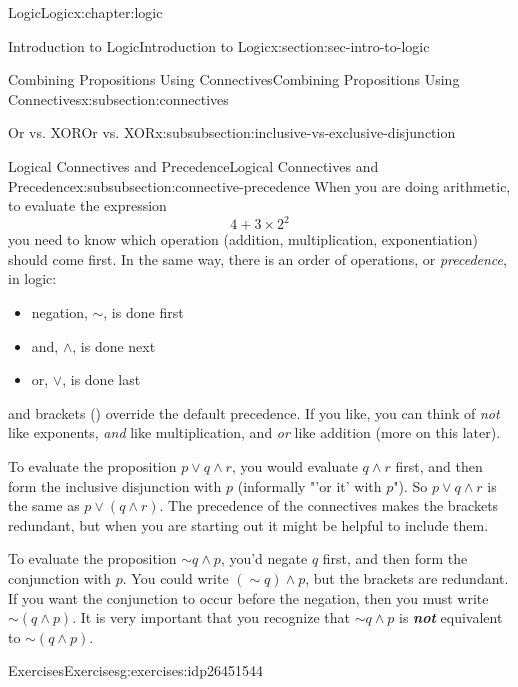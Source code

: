 \documentclass[twoside,10pt,]{book}
\newcommand{\alert}[1]{\textbf{\textit{#1}}}
\numberwithin{equation}{section}
\begin{document}
\begin{chapterptx}{Logic}{}{Logic}{}{}{x:chapter:logic}
\begin{sectionptx}{Introduction to Logic}{}{Introduction to Logic}{}{}{x:section:sec-intro-to-logic}
\begin{subsectionptx}{Combining Propositions Using Connectives}{}{Combining Propositions Using Connectives}{}{}{x:subsection:connectives}
\begin{subsubsectionptx}{Or vs. XOR}{}{Or vs. XOR}{}{}{x:subsubsection:inclusive-vs-exclusive-disjunction}
\end{subsubsectionptx}
%
%
\typeout{************************************************}
\typeout{************************************************}
%
\begin{subsubsectionptx}{Logical Connectives and Precedence}{}{Logical Connectives and Precedence}{}{}{x:subsubsection:connective-precedence}
When you are doing arithmetic, to evaluate the expression%
\begin{equation*}
4+3\times 2^2
\end{equation*}
you need to know which operation (addition, multiplication, exponentiation) should come first.  In the same way, there is an order of operations, or \emph{precedence}, in logic:%
\begin{itemize}[label=\textbullet]
\item{}negation, \(\sim\), is done first%
\item{}and, \({\wedge}\), is done next%
\item{}or, \({\vee}\), is done last%
\end{itemize}
and brackets () override the default precedence.  If you like, you can think of \emph{not} like exponents, \emph{and} like multiplication, and \emph{or} like addition (more on this later).%
\par
To evaluate the proposition \(p{\vee} q{\wedge} r\), you would evaluate \(q{\wedge} r\) first, and then form the inclusive disjunction with \(p\) (informally "'or it' with \(p\)").  So \(p{\vee} q{\wedge} r\) is the same as \(p{\vee}(q{\wedge} r)\).  The precedence of the connectives makes the brackets redundant, but when you are starting out it might be helpful to include them.%
\par
To evaluate the proposition \(\sim\!{q}{\wedge} p\), you'd negate \(q\) first, and then form the conjunction with \(p\).  You could write \((\sim\!{q}){\wedge} p\), but the brackets are redundant.  If you want the conjunction to occur before the negation, then you must write \(\sim\!(q{\wedge} p)\).  It is very important that you recognize that \(\sim\!{q}{\wedge} p\) is \alert{not} equivalent to \(\sim\! (q{\wedge} p)\).%
\end{subsubsectionptx}
\end{subsectionptx}
%
%
\typeout{************************************************}
\typeout{************************************************}
%
\begin{exercises-subsection}{Exercises}{}{Exercises}{}{}{g:exercises:idp26451544}

\end{exercises-subsection}
\end{sectionptx}
\end{chapterptx}
\end{document}
